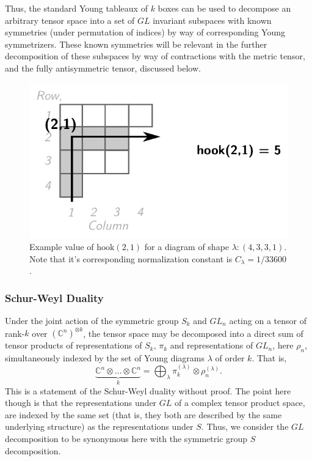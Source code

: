 \documentclass[]{report}
\begin{document}
Thus, the standard Young tableaux of $k$ boxes can be used to decompose an arbitrary tensor space into a set of $GL$ invariant subspaces with known symmetries (under permutation of indices) by way of corresponding Young symmetrizers. These known symmetries will be relevant in the further decomposition of these subspaces by way of contractions with the metric tensor, and the fully antisymmetric tensor, discussed below.
\begin{figure}\centering
	\includegraphics[scale=0.6]{hook-ex.pdf}
	\caption{Example value of $\text{hook}(2,1)$ for a diagram of shape $\lambda:(4,3,3,1)$. Note that it's corresponding normalization constant is $C_{\lambda}=1/33600$.}
\end{figure}

\subsubsection{Schur-Weyl Duality}

Under the joint action of the symmetric group $S_k$ and $GL_n$ acting on a tensor of rank-$k$ over $(\mathbb{C}^n)^{\otimes k}$, the tensor space may be decomposed into a direct sum of tensor products of representations of $S_k$, $\pi_k$ and representations of $GL_n$, here $\rho_n$, simultaneously indexed by the set of Young diagrams $\lambda$ of order $k$. That is,
$$
\underbrace{\mathbb{C}^n\otimes ... \otimes\mathbb{C}^n}_k= \bigoplus_{\lambda}\pi^{(\lambda)}_{k}\otimes\rho_n^{(\lambda)}.
$$
This is a statement of the Schur-Weyl duality without proof. The point here though is that the representations under $GL$ of a complex tensor product space, are indexed by the same set (that is, they both are described by the same underlying structure) as the representations under $S$.  Thus, we consider the $GL$ decomposition to be synonymous here with the symmetric group $S$ decomposition.
\end{document}
